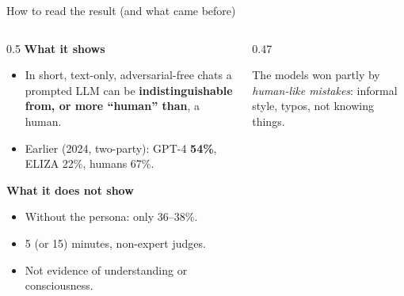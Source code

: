 \begin{frame}{How to read the result (and what came before)}
\begin{columns}[T]
\begin{column}{0.5\textwidth}
\small
\textbf{What it shows}
\begin{itemize}\setlength\itemsep{3pt}
\item In short, text-only, adversarial-free chats a prompted LLM can be \textbf{indistinguishable from, or more ``human'' than}, a human.
\item Earlier (2024, two-party): GPT-4 \textbf{54\%}, ELIZA 22\%, humans 67\%.
\end{itemize}
\textbf{What it does not show}
\begin{itemize}\setlength\itemsep{3pt}
\item Without the persona: only 36--38\%.
\item 5 (or 15) minutes, non-expert judges.
\item Not evidence of understanding or consciousness.
\end{itemize}
\end{column}
\begin{column}{0.47\textwidth}
\vspace{2mm}
\par\small The models won partly by \emph{human-like mistakes}: informal style, typos, not knowing things.
\end{column}
\end{columns}
\end{frame}

